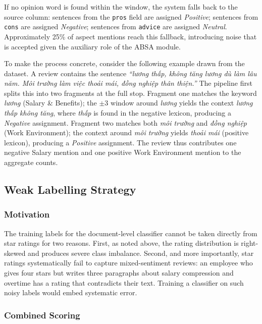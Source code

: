 \documentclass[12pt, a4paper]{article}
\begin{document}
If no opinion word is found within the window, the system falls back to the source column: sentences from the \texttt{pros} field are assigned \textit{Positive}; sentences from \texttt{cons} are assigned \textit{Negative}; sentences from \texttt{advice} are assigned \textit{Neutral}. Approximately 25\% of aspect mentions reach this fallback, introducing noise that is accepted given the auxiliary role of the ABSA module.

To make the process concrete, consider the following example drawn from the dataset. A review contains the sentence \textit{``lương thấp, không tăng lương dù làm lâu năm. Môi trường làm việc thoải mái, đồng nghiệp thân thiện.''} The pipeline first splits this into two fragments at the full stop. Fragment one matches the keyword \textit{lương} (Salary \& Benefits); the $\pm$3 window around \textit{lương} yields the context \textit{lương thấp không tăng}, where \textit{thấp} is found in the negative lexicon, producing a \textit{Negative} assignment. Fragment two matches both \textit{môi trường} and \textit{đồng nghiệp} (Work Environment); the context around \textit{môi trường} yields \textit{thoải mái} (positive lexicon), producing a \textit{Positive} assignment. The review thus contributes one negative Salary mention and one positive Work Environment mention to the aggregate counts.

\subsection{Weak Labelling Strategy}

\subsubsection{Motivation}

The training labels for the document-level classifier cannot be taken directly from star ratings for two reasons. First, as noted above, the rating distribution is right-skewed and produces severe class imbalance. Second, and more importantly, star ratings systematically fail to capture mixed-sentiment reviews: an employee who gives four stars but writes three paragraphs about salary compression and overtime has a rating that contradicts their text. Training a classifier on such noisy labels would embed systematic error.

\subsubsection{Combined Scoring}
\end{document}
